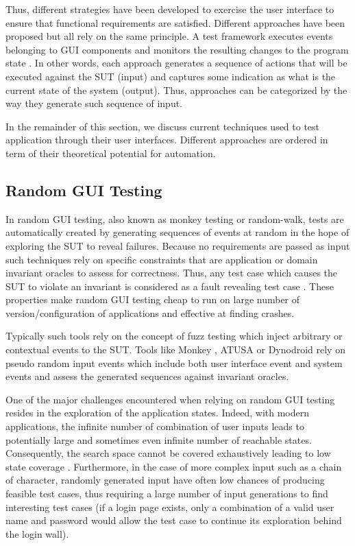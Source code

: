 Thus, different strategies have been developed to exercise the user interface to ensure that functional requirements are satisfied. Different approaches have been proposed but all rely on the same principle. A test framework executes events belonging to GUI components and monitors the resulting changes to the program state \cite{Nguyen2014}. In other words, each approach generates a sequence of actions that will be executed against the SUT (input) and captures some indication as what is the current state of the system (output). Thus, approaches can be categorized by the way they generate such sequence of input.

In the remainder of this section, we discuss current techniques used to test application through their user interfaces. Different approaches are ordered in term of their theoretical potential for automation.

\subsection{Random GUI Testing}
\label{sec:introduction-random-gui-testing}

In random GUI testing, also known as monkey testing or random-walk, tests are automatically created by generating sequences of events at random in the hope of exploring the SUT to reveal failures. Because no requirements are passed as input such techniques rely on specific constraints that are application or domain invariant oracles \cite{Mesbah2009} to assess for correctness. Thus, any test case which causes the SUT to violate an invariant is considered as a fault revealing test case \cite{Barr2015}. These properties make random GUI testing cheap to run on large number of version/configuration of applications and effective at finding crashes.

Typically such tools rely on the concept of fuzz testing which inject arbitrary or contextual events to the SUT. Tools like Monkey \cite{Google2020},  ATUSA \cite{Mesbah2012} or Dynodroid \cite{Machiry2013} rely on pseudo random input events which include both user interface event and system events and assess the generated sequences against invariant oracles. 

One of the major challenges encountered when relying on random GUI testing resides in the exploration of the application states. Indeed, with modern applications, the infinite number of combination of user inputs leads to potentially large and sometimes even infinite number of reachable states. Consequently, the search space cannot be covered exhaustively leading to low state coverage \cite{Canny2019}. Furthermore, in the case of more complex input such as a chain of character, randomly generated input have often low chances of producing feasible test cases, thus requiring a large number of input generations to find interesting test cases (\eg if a login page exists, only a combination of a valid user name and password would allow the test case to continue its exploration behind the login wall).

